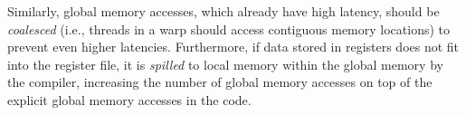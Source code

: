 Similarly, global memory accesses, which already have high latency, should be \emph{coalesced} (i.e., threads in a warp should access contiguous memory locations) to prevent even higher latencies. Furthermore, if data stored in registers does not fit into the register file, it is \emph{spilled} to local memory within the global memory by the compiler, increasing the number of global memory accesses on top of the explicit global memory accesses in the code.





